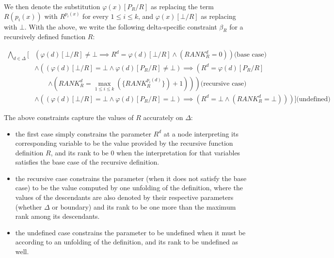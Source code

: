 We then denote the substitution $\varphi(x)[P_{R}/R]$ as replacing the term $R(p_i(x))$ with $R^{p_i(x)}$ for every $1\leq{} i \leq{}k$, and $\varphi(x)[\bot{}/R]$ as replacing with $\bot{}$.
With the above, we write the following delta-specific constraint $\beta_{R}$ for a recursively defined function $R$:

\begin{align*}
\bigwedge\limits_{d \in{} \Delta} \big\lbrack{} & \left( \varphi{}(d)[\bot{}/R] \neq{} \bot{} \implies{} R^{d} = \varphi{}(d)[\bot{}/R] \land{} \left(\textit{RANK}_{R}^{d} = 0\right) \right)\textrm{(base case)}\\
&\land{}  \left( \left( \varphi{}(d)[\bot{}/R] = \bot{} \land{} \varphi{}(d)[P_{R}/R] \neq{} \bot{}  \right) \implies{} \left( R^{d} = \varphi{}(d)[P_{R}/R] \right.\right.\\
&\qquad{} \left.\left. \land{} \left(\textit{RANK}_{R}^{d} = \max\limits_{1 \leq{} i \leq{} k}(\{\textit{RANK}_{R}^{p_i(d)} \}) + 1 \right)\right)  \right) \textrm{(recursive case)}\\
& \land{}  \left( \left( \varphi{}(d)[\bot{}/R] = \bot{} \land{} \varphi{}(d)[P_{R}/R] = \bot{} \right) \implies{} \left( R^{d} = \bot{} \land{} \left(\textit{RANK}_{R}^{d} = \bot{} \right)\right) \right) \big\rbrack{} \textrm{(undefined)}
\end{align*}

The above constraints capture the values of $R$ accurately on $\Delta{}$:
\begin{itemize}
\item{} the first case simply constrains the parameter $R^{d}$ at a node interpreting its corresponding variable to be the value provided by the recursive function definition $R$, and its rank to be $0$ when the interpretation for that variables satisfies the base case of the recursive definition.

\item{} the recursive case constrains the parameter (when it does not satisfy the base case) to be the value computed by one unfolding of the definition, where the values of the descendants are also denoted by their respective parameters (whether $\Delta{}$ or boundary) and its rank to be one more than the maximum rank among its descendants.

\item{} the undefined case constrains the parameter to be undefined when it must be according to an unfolding of the definition, and its rank to be undefined as well.
\end{itemize}


